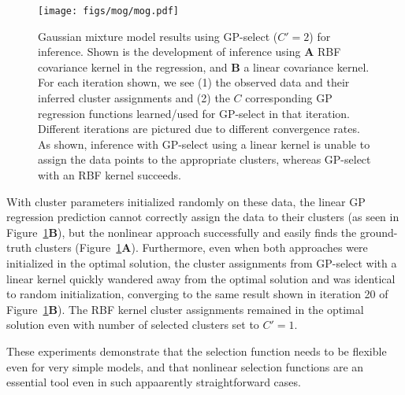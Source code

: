 \begin{figure}[t]
\begin{center}
\texttt{[image: figs/mog/mog.pdf]}
\caption{Gaussian mixture model results using GP-select ($C'=2$) for inference.
Shown is the development of inference using \textbf{A} RBF covariance kernel in the regression, and \textbf{B} a linear covariance kernel.
For each iteration shown, we see (1) the observed data and their inferred cluster assignments and (2) the $C$ corresponding GP regression functions learned/used for GP-select in that iteration. Different iterations are pictured due to different convergence rates. As shown, inference with GP-select using a linear kernel is unable to assign the data points to the appropriate clusters, whereas GP-select with an RBF kernel succeeds.}\label{fig:mog}%
\end{center}
\end{figure}

With cluster parameters initialized randomly on these data, the linear GP regression prediction cannot correctly assign the data to their clusters (as seen in Figure~\ref{fig:mog}\textbf{B}), but the nonlinear approach successfully and easily finds the ground-truth clusters (Figure~\ref{fig:mog}\textbf{A}).
Furthermore, even when both approaches were initialized in the optimal solution, the cluster assignments from GP-select with a linear kernel quickly wandered away from the optimal solution and was identical to random initialization, converging to the same result shown in iteration 20 of Figure~\ref{fig:mog}\textbf{B}).
The RBF kernel cluster assignments remained in the optimal solution even with number of selected clusters set to $C'=1$.


These experiments demonstrate that the selection function needs to be flexible even
for very simple models, and that nonlinear selection functions are an essential tool
even in such appaarently straightforward cases.



